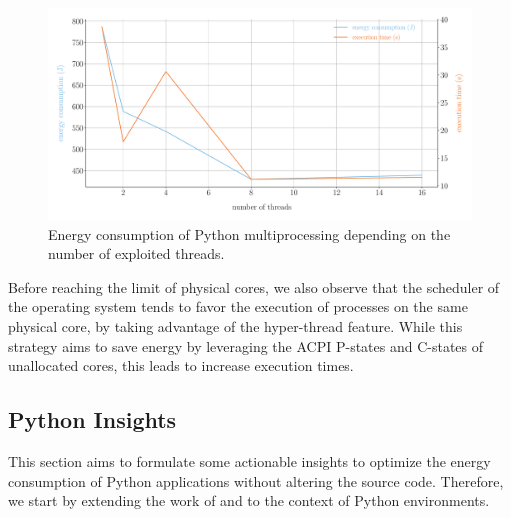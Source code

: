 \begin{figure}[hbt]
    \centering
    \includegraphics[width=\linewidth]{imgs/multiprocessing_energyvstime}
    \caption{Energy consumption of Python multiprocessing depending on the number of exploited threads.}
    \label{fig:python_multiprocessing}
\end{figure}

Before reaching the limit of physical cores, we also observe that the scheduler of the operating system tends to favor the execution of processes on the same physical core, by taking advantage of the hyper-thread feature.
While this strategy aims to save energy by leveraging the ACPI P-states and C-states of unallocated cores, this leads to increase execution times.



\subsection{Python Insights}
This section aims to formulate some actionable insights to optimize the energy consumption of Python applications without altering the source code.
Therefore, we start by extending the work of \citeauthor{hasan_energy_2016} and \citeauthor{oliveira_recommending_nodate} to the context of Python environments.

